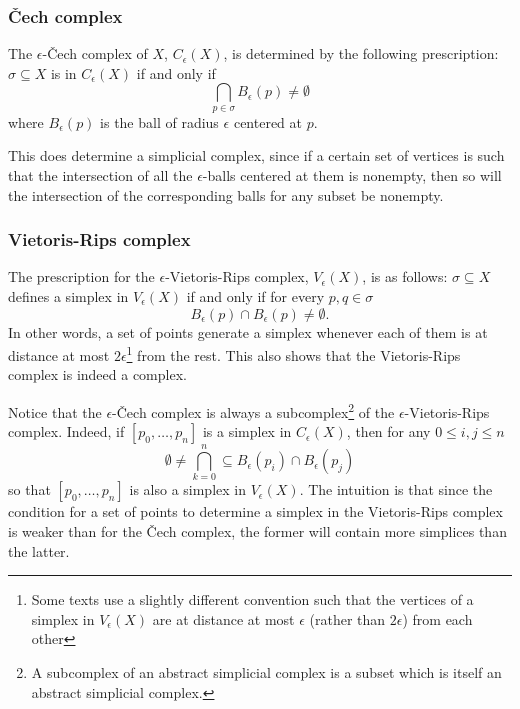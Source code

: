 \documentclass[../main.tex]{subfiles}
\begin{document}
\subsubsection{Čech complex}
The \( \epsilon \)-Čech complex of \( X \), \( C_\epsilon(X) \), is determined by the
following prescription: \( \sigma \subseteq X \) is in \( C_\epsilon(X) \) if and only if
\begin{equation*} \bigcap_{p \in \sigma} B_\epsilon(p) \neq \emptyset \end{equation*}
where \( B_\epsilon(p) \) is the ball of radius \( \epsilon \) centered at \( p \). 

This does determine a simplicial complex, since if a certain set of vertices is such that
the intersection of all the \( \epsilon \)-balls centered at them is nonempty, then so
will the intersection of the corresponding balls for any subset be nonempty.

\subsubsection{Vietoris-Rips complex}
The prescription for the \( \epsilon \)-Vietoris-Rips
complex, \( V_\epsilon(X) \), is as follows: \( \sigma \subseteq X \) defines a simplex in
\( V_\epsilon(X) \) if and only if for every \( p, q \in \sigma \) 
\begin{equation*}
	B_\epsilon(p) \cap B_\epsilon(p) \neq \emptyset.
\end{equation*}
In other words, a set of points generate a simplex whenever each of them is at distance at
most \( 2\epsilon \)\footnote{Some texts use a slightly different convention such that the
vertices of a simplex in	\( V_\epsilon(X) \) are at distance at most \( \epsilon \) (rather
than \( 2\epsilon \)) from each other} from the rest. This also shows that the
Vietoris-Rips complex is indeed a complex.

Notice that the \( \epsilon \)-Čech complex is always a subcomplex\footnote{A subcomplex
of an abstract simplicial complex is a subset which is itself an abstract simplicial
complex.} of the \( \epsilon \)-Vietoris-Rips complex. Indeed, if \( [p_0, \dots, p_n] \) is a
simplex in \( C_\epsilon(X) \), then for any \( 0 \leq i,j \leq n \)
\begin{equation*}
	\emptyset \neq \bigcap_{k = 0}^n \subseteq B_\epsilon(p_i) \cap B_\epsilon(p_j)
\end{equation*}
so that \( [p_0, \dots, p_n] \) is also a simplex in \( V_\epsilon(X) \). The intuition is
that since the condition for a set of points to determine a simplex in the Vietoris-Rips
complex is weaker than for the Čech complex, the former will contain more simplices than
the latter.
\end{document}
